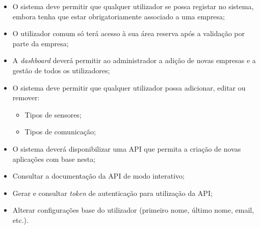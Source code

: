 \begin{itemize}
	\item O sistema deve permitir que qualquer utilizador se possa registar no sistema, embora tenha que estar obrigatoriamente associado a uma empresa;
	
	\item O utilizador comum só terá acesso à sua área reserva após a validação por parte da empresa;
	
	\item A \textit{dashboard} deverá permitir ao administrador a adição de novas empresas e a gestão de todos os utilizadores;
	
	
	\item O sistema deve permitir que qualquer utilizador possa adicionar, editar ou remover: 
	\begin{itemize}
		\item Tipos de sensores; 
		
		\item Tipos de comunicação;
		
		
		
		
		
		
		
	\end{itemize}
	
	
	\item O sistema deverá disponibilizar uma \ac{API} que permita a criação de novas aplicações com base nesta;
	
	\item Consultar a documentação da \ac{API} de modo interativo;
	
	\item Gerar e consultar  \textit{token} de autenticação para utilização da \ac{API};
	
	\item Alterar configurações base do utilizador (primeiro nome, último nome, email, etc.).
	
\end{itemize}



